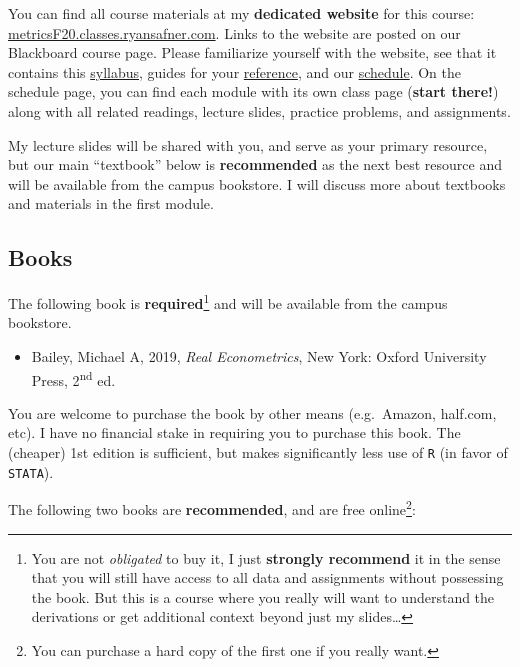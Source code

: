 \documentclass{article}
\providecommand{\tightlist}{%
  \setlength{\itemsep}{0pt}\setlength{\parskip}{0pt}}
\begin{document}
You can find all course materials at my \textbf{dedicated website} for
this course:
\href{https://metricsF20.classes.ryansafner.com}{metricsF20.classes.ryansafner.com}.
Links to the website are posted on our Blackboard course page. Please
familiarize yourself with the website, see that it contains this
\href{https://metricsF20.classes.ryansafner.com/syllabus/}{syllabus},
guides for your
\href{https://metricsF20.classes.ryansafner.com/reference/}{reference},
and our
\href{https://metricsF20.classes.ryansafner.com/schedule/}{schedule}. On
the schedule page, you can find each module with its own class page
(\textbf{start there!}) along with all related readings, lecture slides,
practice problems, and assignments.

My lecture slides will be shared with you, and serve as your primary
resource, but our main ``textbook'' below is \textbf{recommended} as the
next best resource and will be available from the campus bookstore. I
will discuss more about textbooks and materials in the first module.

\hypertarget{books}{%
\subsection*{Books}\label{books}}

The following book is \textbf{required}\footnote{You are not
  \emph{obligated} to buy it, I just \textbf{strongly recommend} it in
  the sense that you will still have access to all data and assignments
  without possessing the book. But this is a course where you really
  will want to understand the derivations or get additional context
  beyond just my slides\ldots{}} and will be available from the campus
bookstore.

\begin{itemize}
\tightlist
\item
  Bailey, Michael A, 2019, \emph{Real Econometrics}, New York: Oxford
  University Press, 2\textsuperscript{nd} ed.
\end{itemize}

You are welcome to purchase the book by other means (e.g.~Amazon,
half.com, etc). I have no financial stake in requiring you to purchase
this book. The (cheaper) 1st edition is sufficient, but makes
significantly less use of \texttt{R} (in favor of \texttt{STATA}).

The following two books are \textbf{recommended}, and are free
online\footnote{You can purchase a hard copy of the first one if you
  really want.}:
\end{document}

